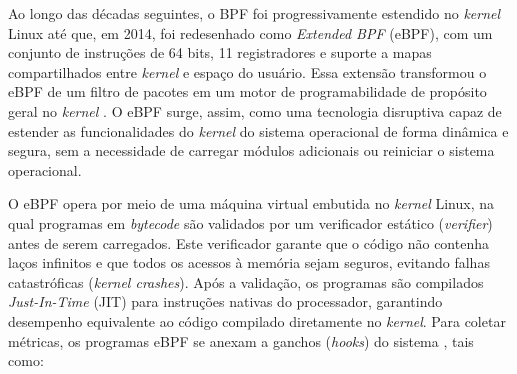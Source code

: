 Ao longo das décadas seguintes, o BPF foi progressivamente estendido no \textit{kernel} Linux até que, em 2014, foi redesenhado como \textit{Extended BPF} (eBPF), com um conjunto de instruções de 64 bits, 11 registradores e suporte a mapas compartilhados entre \textit{kernel} e espaço do usuário. Essa extensão transformou o eBPF de um filtro de pacotes em um motor de programabilidade de propósito geral no \textit{kernel} \cite{gregg_bpf_2019, 10.1109/NOMS47738.2020.9110434}. O eBPF surge, assim, como uma tecnologia disruptiva capaz de estender as funcionalidades do \textit{kernel} do sistema operacional de forma dinâmica e segura, sem a necessidade de carregar módulos adicionais ou reiniciar o sistema operacional.

O eBPF opera por meio de uma máquina virtual embutida no \textit{kernel} Linux, na qual programas em \textit{bytecode} são validados por um verificador estático (\textit{verifier}) antes de serem carregados. Este verificador garante que o código não contenha laços infinitos e que todos os acessos à memória sejam seguros, evitando falhas catastróficas (\textit{kernel crashes}). Após a validação, os programas são compilados \textit{Just-In-Time} (JIT) para instruções nativas do processador, garantindo desempenho equivalente ao código compilado diretamente no \textit{kernel}. Para coletar métricas, os programas eBPF se anexam a ganchos (\textit{hooks}) do sistema \cite{gregg_bpf_2019, 10.1109/NOMS47738.2020.9110434, mizinski2025impact}, tais como:

